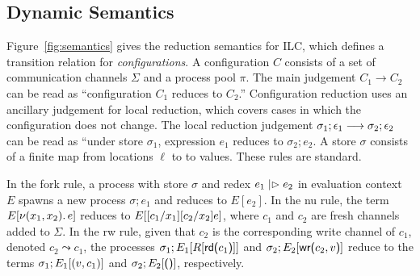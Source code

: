 


\subsection{Dynamic Semantics}
\label{subsec:semantics}



Figure~\ref{fig:semantics} gives the reduction semantics for ILC, which defines
a transition relation for \emph{configurations}. A configuration $C$ consists of
a set of communication channels $\Sigma$ and a process pool $\pi$. The main judgement
$C_1 \longrightarrow C_2$ can be read as ``configuration $C_1$ reduces to $C_2$.''
Configuration reduction uses an ancillary judgement for local reduction, which
covers cases in which the configuration does not change. The local reduction
judgement $\sigma_1; \epsilon_1 \longrightarrow \sigma_2; \epsilon_2$ can be read as ``under store $\sigma_1$,
expression $e_1$ reduces to $\sigma_{2}; e_2$. A store $\sigma$ consists of a finite map
from locations $\ell$ to to values. These rules are standard.

In the fork rule, a process with store $\sigma$ and redex $e_1 \mathrel{|\rhd} e_2$ in
evaluation context $E$ spawns a new process $\sigma; e_1$ and reduces to $E[e_2]$. In
the nu rule, the term $E[ \nu(x_1, x_2).\,e ]$ reduces to $E[
  [c_1/x_1][c_2/x_2]e ]$, where $c_1$ and $c_2$ are fresh
channels added to $\Sigma$. In the rw rule, given that $c_2$ is the corresponding
write channel of $c_1$, denoted $c_2 \leadsto c_1$, the processes $\sigma_1 ; E_1[R[
    \text{\textsf{rd}}\textsf{(}{c_1}\textsf{)}] ]$ and $\sigma_2 ; E_2[ \text{\textsf{wr}}\textsf{(}{c_2},{v}\textsf{)}]$ reduce to the
terms $\sigma_1 ; E_1[ (v, c_1)]$ and $\sigma_2 ; E_2[ \textsf{()}]$, respectively.

\begin{comment}






\end{comment}


